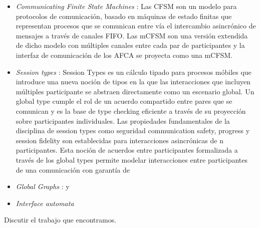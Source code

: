\begin{itemize}
\item \emph{Communicating Finite State Machines} \cite{brand:jacm-30_2}:  Las CFSM son un modelo para protocolos de comunicación, basado en máquinas de estado finitas que representan procesos que se comunican entre vía el intercambio asincrónico de mensajes a través de canales FIFO. Las mCFSM son una versión extendida de dicho modelo con múltiples canales entre cada par de participantes y la interfaz de comunicación de los AFCA se proyecta como una mCFSM.
\item \emph{Session types} \cite{honda:esop98,honda:popl08}: Session Types es un cálculo tipado para procesos móbiles que introduce una nueva noción de tipos en la que las interacciones que incluyen múltiples participante se abstraen directamente como un escenario global. Un global type cumple el rol de un acuerdo compartido entre pares que se comunican y es la base de type checking eficiente a través de su proyección sobre participantes individuales. Las propiedades fundamentales de la disciplina de session types como seguridad communication safety, progress y session fidelity son establecidas para interacciones asincrónicas de n participantes. Esta noción de acuerdos entre participantes formalizada a través de los global types permite modelar interacciones entre participantes de una comunicación con garantía de 
\item \emph{Global Graphs} \cite{castagna:lmcs-8_1}: 
 y 
\item \emph{Interface automata} \cite{dealfaro:esec-fse-01}
\end{itemize}

Discutir el trabajo que encontramos.